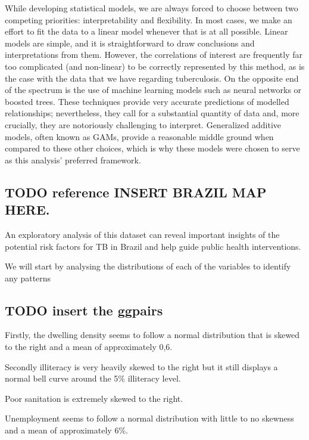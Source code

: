 \documentclass[
  letterpaper,
  DIV=11,
  numbers=noendperiod]{scrartcl}
\begin{document}
While developing statistical models, we are always forced to choose
between two competing priorities: interpretability and flexibility. In
most cases, we make an effort to fit the data to a linear model whenever
that is at all possible. Linear models are simple, and it is
straightforward to draw conclusions and interpretations from them.
However, the correlations of interest are frequently far too complicated
(and non-linear) to be correctly represented by this method, as is the
case with the data that we have regarding tuberculosis. On the opposite
end of the spectrum is the use of machine learning models such as neural
networks or boosted trees. These techniques provide very accurate
predictions of modelled relationships; nevertheless, they call for a
substantial quantity of data and, more crucially, they are notoriously
challenging to interpret. Generalized additive models, often known as
GAMs, provide a reasonable middle ground when compared to these other
choices, which is why these models were chosen to serve as this
analysis' preferred framework.

\hypertarget{todo-reference-insert-brazil-map-here.}{%
\subsection{TODO reference INSERT BRAZIL MAP
HERE.}\label{todo-reference-insert-brazil-map-here.}}

An exploratory analysis of this dataset can reveal important insights of
the potential risk factors for TB in Brazil and help guide public health
interventions.

We will start by analysing the distributions of each of the variables to
identify any patterns

\hypertarget{todo-insert-the-ggpairs}{%
\subsection{TODO insert the ggpairs}\label{todo-insert-the-ggpairs}}

Firstly, the dwelling density seems to follow a normal distribution that
is skewed to the right and a mean of approximately 0,6.

Secondly illiteracy is very heavily skewed to the right but it still
displays a normal bell curve around the 5\% illiteracy level.

Poor sanitation is extremely skewed to the right.

Unemployment seems to follow a normal distribution with little to no
skewness and a mean of approximately 6\%.
\end{document}
